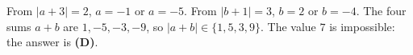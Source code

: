 From $|a+3|=2$, $a=-1$ or $a=-5$. From $|b+1|=3$, $b=2$ or $b=-4$. The four sums $a+b$ are $1,-5,-3,-9$, so $|a+b|\in\{1,5,3,9\}$. The value $7$ is impossible: the answer is \textbf{(D)}.
